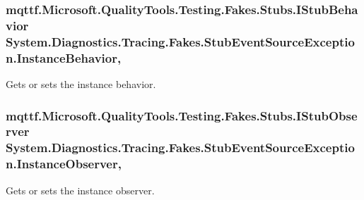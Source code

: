 \hypertarget{class_system_1_1_diagnostics_1_1_tracing_1_1_fakes_1_1_stub_event_source_exception_ae367d45114fea6fe9c5365875a9938df}{
\subsubsection[{Instance\-Behavior}]{\setlength{\rightskip}{0pt plus 5cm}mqttf.\-Microsoft.\-Quality\-Tools.\-Testing.\-Fakes.\-Stubs.\-I\-Stub\-Behavior System.\-Diagnostics.\-Tracing.\-Fakes.\-Stub\-Event\-Source\-Exception.\-Instance\-Behavior\hspace{0.3cm}{\ttfamily [get]}, {\ttfamily [set]}}}\label{class_system_1_1_diagnostics_1_1_tracing_1_1_fakes_1_1_stub_event_source_exception_ae367d45114fea6fe9c5365875a9938df}


Gets or sets the instance behavior.

\hypertarget{class_system_1_1_diagnostics_1_1_tracing_1_1_fakes_1_1_stub_event_source_exception_a56d98bcd49ef8b54f4b0e3cb6bb5ea6a}{
\subsubsection[{Instance\-Observer}]{\setlength{\rightskip}{0pt plus 5cm}mqttf.\-Microsoft.\-Quality\-Tools.\-Testing.\-Fakes.\-Stubs.\-I\-Stub\-Observer System.\-Diagnostics.\-Tracing.\-Fakes.\-Stub\-Event\-Source\-Exception.\-Instance\-Observer\hspace{0.3cm}{\ttfamily [get]}, {\ttfamily [set]}}}\label{class_system_1_1_diagnostics_1_1_tracing_1_1_fakes_1_1_stub_event_source_exception_a56d98bcd49ef8b54f4b0e3cb6bb5ea6a}


Gets or sets the instance observer.

